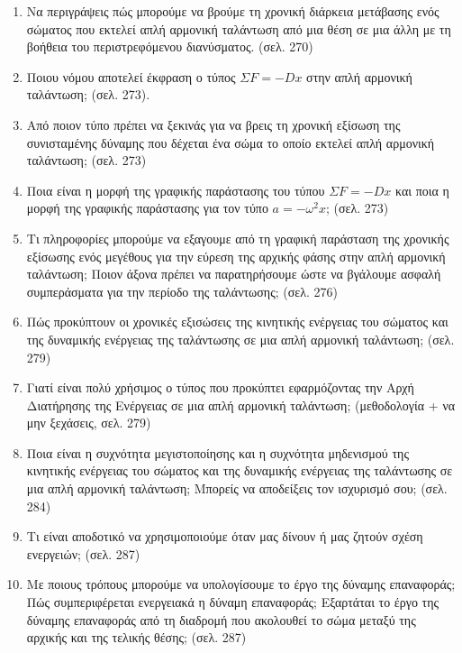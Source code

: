 \documentclass{article}
\begin{document}
\begin{enumerate}
      \item Να περιγράψεις πώς μπορούμε να βρούμε τη χρονική διάρκεια μετάβασης ενός σώματος που εκτελεί απλή αρμονική ταλάντωση από μια θέση σε μια άλλη με τη βοήθεια του περιστρεφόμενου διανύσματος. (σελ. 270)

      \item Ποιου νόμου αποτελεί έκφραση ο τύπος $\Sigma F = -Dx$ στην απλή αρμονική ταλάντωση; (σελ. 273).

      \item Από ποιον τύπο πρέπει να ξεκινάς για να βρεις τη χρονική εξίσωση της συνισταμένης δύναμης που δέχεται ένα σώμα το οποίο εκτελεί απλή αρμονική ταλάντωση; (σελ. 273)

      \item Ποια είναι η μορφή της γραφικής παράστασης του τύπου $\Sigma F = -Dx$ και ποια η μορφή της γραφικής παράστασης για τον τύπο $a = -\omega^2 x$; (σελ. 273)

      \item Τι πληροφορίες μπορούμε να εξαγουμε από τη γραφική παράσταση της χρονικής εξίσωσης ενός μεγέθους για την εύρεση της αρχικής φάσης στην απλή αρμονική ταλάντωση; Ποιον άξονα πρέπει να παρατηρήσουμε ώστε να βγάλουμε ασφαλή συμπεράσματα για την περίοδο της ταλάντωσης; (σελ. 276)

      \item Πώς προκύπτουν οι χρονικές εξισώσεις της κινητικής ενέργειας του σώματος και της δυναμικής ενέργειας της ταλάντωσης σε μια απλή αρμονική ταλάντωση; (σελ. 279)

      \item Γιατί είναι πολύ χρήσιμος ο τύπος που προκύπτει εφαρμόζοντας την Αρχή Διατήρησης της Ενέργειας σε μια απλή αρμονική ταλάντωση; (μεθοδολογία + να μην ξεχάσεις, σελ. 279)

      \item Ποια είναι η συχνότητα μεγιστοποίησης και η συχνότητα μηδενισμού της κινητικής ενέργειας του σώματος και της δυναμικής ενέργειας της ταλάντωσης σε μια απλή αρμονική ταλάντωση; Μπορείς να αποδείξεις τον ισχυρισμό σου; (σελ. 284)

      \item Τι είναι αποδοτικό να χρησιμοποιούμε όταν μας δίνουν ή μας ζητούν σχέση ενεργειών; (σελ. 287)

      \item Με ποιους τρόπους μπορούμε να υπολογίσουμε το έργο της δύναμης επαναφοράς; Πώς συμπεριφέρεται ενεργειακά η δύναμη επαναφοράς; Εξαρτάται το έργο της δύναμης επαναφοράς από τη διαδρομή που ακολουθεί το σώμα μεταξύ της αρχικής και της τελικής θέσης; (σελ. 287)


\end{enumerate}
\end{document}
